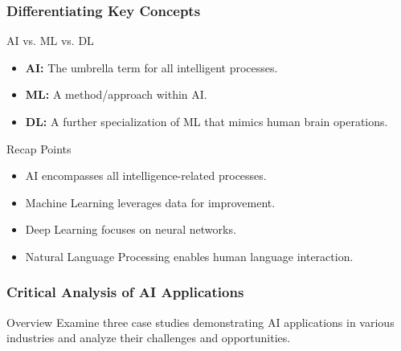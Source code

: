\documentclass{beamer}
\begin{document}
\begin{frame}[fragile]
    \frametitle{Differentiating Key Concepts}
    \begin{block}{AI vs. ML vs. DL}
        \begin{itemize}
            \item \textbf{AI:} The umbrella term for all intelligent processes.
            \item \textbf{ML:} A method/approach within AI.
            \item \textbf{DL:} A further specialization of ML that mimics human brain operations.
        \end{itemize}
    \end{block}
    
    \begin{block}{Recap Points}
        \begin{itemize}
            \item AI encompasses all intelligence-related processes.
            \item Machine Learning leverages data for improvement.
            \item Deep Learning focuses on neural networks.
            \item Natural Language Processing enables human language interaction.
        \end{itemize}
    \end{block}
\end{frame}

\begin{frame}[fragile]
    \frametitle{Critical Analysis of AI Applications}
    \begin{block}{Overview}
        Examine three case studies demonstrating AI applications in various industries and analyze their challenges and opportunities.
    \end{block}
\end{frame}
\end{document}
